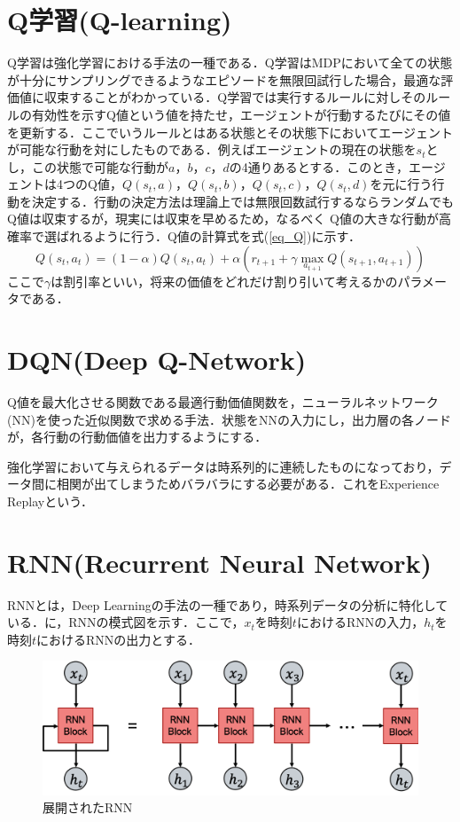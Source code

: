 \documentclass{eithesis}
\begin{document}
  \section{Q学習(Q-learning)}
    Q学習は強化学習における手法の一種である．Q学習はMDPにおいて全ての状態が十分にサンプリングできるようなエピソードを無限回試行した場合，最適な評価値に収束することがわかっている．Q学習では実行するルールに対しそのルールの有効性を示すQ値という値を持たせ，エージェントが行動するたびにその値を更新する．ここでいうルールとはある状態とその状態下においてエージェントが可能な行動を対にしたものである．例えばエージェントの現在の状態を$s_{t}$とし，この状態で可能な行動が$a$，$b$，$c$，$d$の4通りあるとする．このとき，エージェントは4つのQ値，$Q(s_{t},a)$，$Q(s_{t},b)$，$Q(s_{t},c)$，$Q(s_{t},d)$を元に行う行動を決定する．行動の決定方法は理論上では無限回数試行するならランダムでもQ値は収束するが，現実には収束を早めるため，なるべく Q値の大きな行動が高確率で選ばれるように行う．Q値の計算式を式(\ref{eq_Q})に示す．
    \begin{equation}\label{eq_Q}
      Q\left(s_{t}, a_{t}\right) = (1-\alpha) Q\left(s_{t}, a_{t}\right)+\alpha\left(r_{t+1}+\gamma \max _{a_{t+1}} Q\left(s_{t+1}, a_{t+1}\right)\right)
    \end{equation}
    ここで$\gamma$は割引率といい，将来の価値をどれだけ割り引いて考えるかのパラメータである．
  \section{DQN(Deep Q-Network)}
    Q値を最大化させる関数である最適行動価値関数を，ニューラルネットワーク(NN)を使った近似関数で求める手法．状態をNNの入力にし，出力層の各ノードが，各行動の行動価値を出力するようにする．

    強化学習において与えられるデータは時系列的に連続したものになっており，データ間に相関が出てしまうためバラバラにする必要がある．これをExperience Replayという．

  \section{RNN(Recurrent Neural Network)}
    RNNとは，Deep Learningの手法の一種であり，時系列データの分析に特化している．に，RNNの模式図を示す．ここで，$x_t$を時刻$t$におけるRNNの入力，$h_t$を時刻$t$におけるRNNの出力とする．
    \begin{figure}[htbp]
      \centering
      \includegraphics[width=14cm]{./images/RNN.png}
      \caption{展開されたRNN}
      \label{fig_RNN}
    \end{figure}
\end{document}
